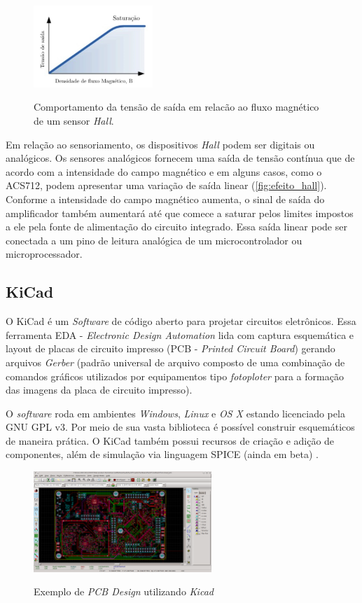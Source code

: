 \begin{figure}[H]
	\centering
	\caption{Comportamento da tensão de saída em relacão ao fluxo magnético de um sensor \textit{Hall}.}
	\includegraphics[width=0.4\textwidth]{figuras/grafico_hall.jpg}
	\label{fig:efeito_hall}
\end{figure} 

Em relação ao sensoriamento, os dispositivos \textit{Hall} podem ser digitais ou analógicos. Os sensores analógicos fornecem uma saída de tensão contínua que de acordo com a intensidade do campo magnético e em alguns casos, como o ACS712, podem apresentar uma variação de saída linear (\autoref{fig:efeito_hall}). Conforme a intensidade do campo magnético aumenta, o sinal de saída do amplificador também aumentará até que comece a saturar pelos limites impostos a ele pela fonte de alimentação do circuito integrado. Essa saída linear pode ser conectada a um pino de leitura analógica de um microcontrolador ou microprocessador.

\subsection{KiCad}

O KiCad é um \textit{Software} de código aberto para projetar circuitos eletrônicos. Essa ferramenta EDA - \textit{Electronic Design Automation} lida com captura esquemática e layout de placas de circuito impresso (PCB - \textit{Printed Circuit Board}) gerando arquivos \textit{Gerber} (padrão universal de arquivo composto de uma combinação de comandos gráficos utilizados por equipamentos tipo \textit{fotoploter} para a formação das imagens da placa de circuito impresso).

O \textit{software} roda em ambientes \textit{Windows}, \textit{Linux} e \textit{OS X} estando licenciado pela GNU GPL v3. Por meio de sua vasta biblioteca é possível construir esquemáticos de maneira prática. O KiCad também possui recursos de criação e adição de componentes, além de simulação via linguagem SPICE (ainda em beta) \cite{Kicad}. 

\begin{figure}[H]
	\centering
	\caption{Exemplo de \textit{PCB Design} utilizando \textit{Kicad}}
	\includegraphics[width=0.6\textwidth]{figuras/kicad_pcbnew.png}
	\label{fig:kicad_pcbnew}
\end{figure} 


